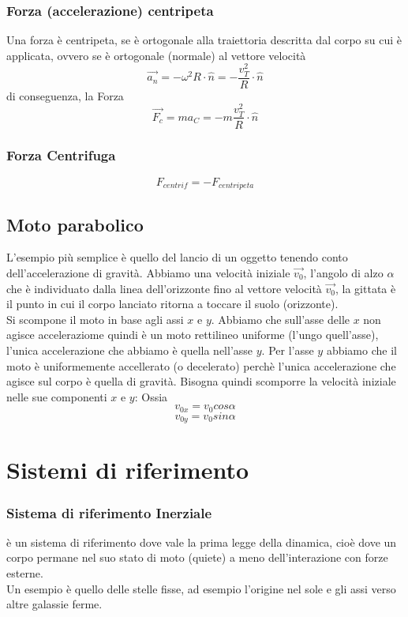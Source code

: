 \documentclass[a4paper]{report}
\begin{document}
  \subsection{Forza (accelerazione) centripeta}
  Una forza è centripeta, se è ortogonale alla traiettoria descritta dal corpo su cui è applicata, ovvero se è ortogonale (normale) al vettore velocità
  $$ \vec{a_n} = -\omega^2 R \cdot \hat{n} = -\frac{v_T^2}{R} \cdot \hat{n} $$
  di conseguenza, la Forza
  $$ \vec{F_c} = ma_C =  -m\frac{v_T^2}{R} \cdot \hat{n}$$

  \subsection{Forza Centrifuga}
  $$ F_{centrif} = - F_{centripeta} $$


  \section{Moto parabolico}
  L'esempio più semplice è quello del lancio di un oggetto tenendo conto dell'accelerazione di gravità. Abbiamo una velocità iniziale $\vec{v_0}$, l'angolo di alzo $\alpha$ che è individuato dalla linea dell'orizzonte fino al vettore velocità $\vec{v_0}$, la gittata è il punto in cui il corpo lanciato ritorna a toccare il suolo (orizzonte).\\
  Si scompone il moto in base agli assi $x$ e $y$. Abbiamo che sull'asse delle $x$ non agisce acceleraziome quindi è un moto rettilineo uniforme (l'ungo quell'asse), l'unica accelerazione che abbiamo è quella nell'asse $y$.
  Per l'asse $y$ abbiamo che il moto è uniformemente accellerato (o decelerato) perchè l'unica accelerazione che agisce sul corpo è quella di gravità.
  Bisogna quindi scomporre la velocità iniziale nelle sue componenti $x$ e $y$: Ossia
  $$v_{0x} = v_0 cos\alpha$$
  $$v_{0y} = v_0 sin\alpha$$


  \chapter{Sistemi di riferimento}
  \subsection{Sistema di riferimento Inerziale}
  è un sistema di riferimento dove vale la prima legge della dinamica, cioè dove un corpo permane nel suo stato di moto (quiete) a meno dell'interazione con forze esterne.\\
  Un esempio è quello delle stelle fisse, ad esempio l'origine nel sole e gli assi verso altre galassie ferme.
\end{document}
